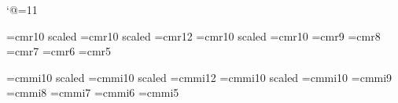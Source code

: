 %







\catcode`@=11


\font\eighteenrm=cmr10 scaled		%
\font\fourteenrm=cmr10 scaled		%
\font\twelverm=cmr12				%
\font\elevenrm=cmr10 scaled\magstephalf		%
\font\tenrm=cmr10
\font\ninerm=cmr9
\font\eightrm=cmr8
\font\sevenrm=cmr7
\font\sixrm=cmr6
\font\fiverm=cmr5

\font\eighteeni=cmmi10 scaled		%
\font\fourteeni=cmmi10 scaled		%
\font\twelvei=cmmi12				%
\font\eleveni=cmmi10 scaled\magstephalf		%
\font\teni=cmmi10
\font\ninei=cmmi9
\font\eighti=cmmi8
\font\seveni=cmmi7
\font\sixi=cmmi6
\font\fivei=cmmi5

